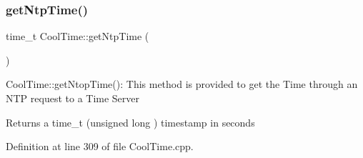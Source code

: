 \subsubsection{\texorpdfstring{get\+Ntp\+Time()}{getNtpTime()}}
{\footnotesize\ttfamily time\+\_\+t Cool\+Time\+::get\+Ntp\+Time (\begin{DoxyParamCaption}{ }\end{DoxyParamCaption})}

Cool\+Time\+::get\+Ntop\+Time()\+: This method is provided to get the Time through an N\+TP request to a Time Server

\begin{DoxyReturn}{Returns}
a time\+\_\+t (unsigned long ) timestamp in seconds 
\end{DoxyReturn}


Definition at line 309 of file Cool\+Time.\+cpp.


